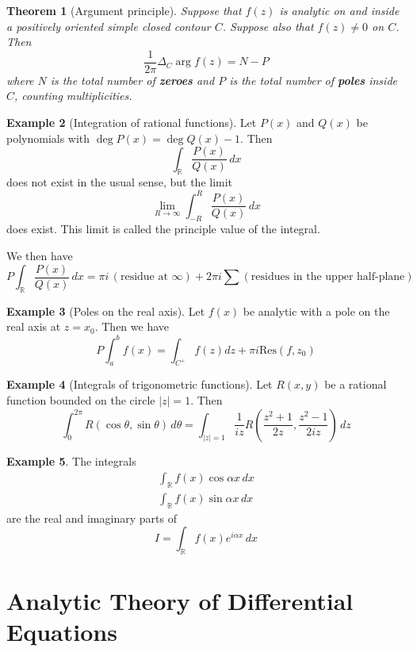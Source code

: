 \documentclass[10pt, oneside, reqno]{amsart}
\theoremstyle{plain}%
\newtheorem{thm}{Theorem}[section]
\theoremstyle{definition}
\newtheorem{exmp}[thm]{Example}
\theoremstyle{remark}
\newcommand{\res}[2]{\text{Res}(#1,#2)}
\newcommand{\R}{\mathbb{R}}
\begin{document}
\begin{thm}[Argument principle]
	Suppose that $f(z)$ is analytic on and inside a positively oriented simple closed contour $C$.  Suppose also that $f(z) \neq 0$ on $C$.  Then \[
		\frac{1}{2\pi} \Delta_C \arg f(z) = N - P
	\] where $N$ is the total number of \textbf{zeroes} and $P$ is the total number of \textbf{poles} inside $C$, counting multiplicities.
\end{thm}

\begin{exmp}[Integration of rational functions]
	Let $P(x)$ and $Q(x)$ be polynomials with $\deg P(x) = \deg Q(x) - 1$.  Then \[
		\int_\R \frac{P(x)}{Q(x)} \, dx 
 	\] does not exist in the usual sense, but the limit \[
 		\lim_{R \rightarrow \infty} \int_{-R}^R \frac{P(x)}{Q(x)} \, dx
 	\] does exist.  This limit is called the principle value of the integral.

 	We then have 
\[
	P \int_{\R} \frac{P(x)}{Q(x)} \, dx = \pi i \,(\text{residue at $\infty$}) + 2 \pi i \sum (\text{residues in the upper half-plane})
\]
\end{exmp}

\begin{exmp}[Poles on the real axis]
	Let $f(x)$ be analytic with a pole on the real axis at $z = x_0$.  Then we have \[
		P \int_a^b f(x) = \int_{C^+} f(z) dz + \pi i \res{f}{z_0}
	\]
\end{exmp}


\begin{exmp}[Integrals of trigonometric functions]
	Let $R(x,y)$ be a rational function bounded on the circle $|z| = 1$.  Then \[
		\int_0^{2 \pi} R(\cos \theta, \sin \theta) \, d \theta = \int_{|z| = 1} \frac{1}{iz} R\left( \frac{z^2 + 1}{2z}, \frac{z^2 - 1}{2 i z} \right) \, dz
	\] 
\end{exmp}

\begin{exmp}
	The integrals \begin{align*}
		\int_\R f(x) \cos \alpha x \, dx \\
		\int_\R f(x) \sin \alpha x \, dx
	\end{align*}
	are the real and imaginary parts of \[
		I = \int_\R f(x) e^{i \alpha x} \, dx
	\]
	
\end{exmp}




\section{Analytic Theory of Differential Equations} %
\label{cha:analytic_theory_of_differential_equations}
\end{document}
